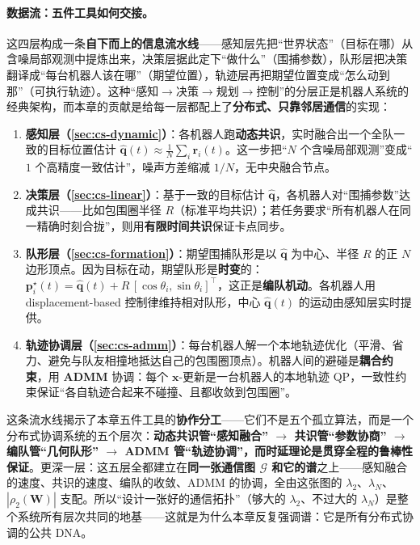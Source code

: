 \paragraph{数据流：五件工具如何交接。}
这四层构成一条\textbf{自下而上的信息流水线}——感知层先把“世界状态”（目标在哪）从含噪局部观测中提炼出来，决策层据此定下“做什么”（围捕参数），队形层把决策翻译成“每台机器人该在哪”（期望位置），轨迹层再把期望位置变成“怎么动到那”（可执行轨迹）。这种“感知$\to$决策$\to$规划$\to$控制”的分层正是机器人系统的经典架构，而本章的贡献是给每一层都配上了\textbf{分布式、只靠邻居通信}的实现：
\begin{enumerate}
  \item \textbf{感知层（\cref{sec:cs-dynamic}）}：各机器人跑\textbf{动态共识}，实时融合出一个全队一致的目标位置估计 $\hat{\mathbf{q}}(t)\approx\tfrac1N\sum_i\mathbf{r}_i(t)$。这一步把“$N$ 个含噪局部观测”变成“$1$ 个高精度一致估计”，噪声方差缩减 $1/N$，无中央融合节点。
  \item \textbf{决策层（\cref{sec:cs-linear}）}：基于一致的目标估计 $\hat{\mathbf{q}}$，各机器人对“围捕参数”达成共识——比如包围圈半径 $R$（标准平均共识）；若任务要求“所有机器人在同一精确时刻合拢”，则用\textbf{有限时间共识}保证卡点同步。
  \item \textbf{队形层（\cref{sec:cs-formation}）}：期望围捕队形是以 $\hat{\mathbf{q}}$ 为中心、半径 $R$ 的正 $N$ 边形顶点。因为目标在动，期望队形是\textbf{时变}的：$\mathbf{p}_i^\star(t)=\hat{\mathbf{q}}(t)+R\,[\cos\theta_i,\sin\theta_i]^\top$，这正是\textbf{编队机动}。各机器人用 displacement-based 控制律维持相对队形，中心 $\hat{\mathbf{q}}(t)$ 的运动由感知层实时提供。
  \item \textbf{轨迹协调层（\cref{sec:cs-admm}）}：每台机器人解一个本地轨迹优化（平滑、省力、避免与队友相撞地抵达自己的包围圈顶点）。机器人间的避碰是\textbf{耦合约束}，用 \textbf{ADMM} 协调：每个 $\mathbf{x}$-更新是一台机器人的本地轨迹 QP，一致性约束保证“各自轨迹合起来不碰撞、且都收敛到包围圈”。
\end{enumerate}

\begin{insight}\label{ins:cs-pipeline}
这条流水线揭示了本章五件工具的\textbf{协作分工}——它们不是五个孤立算法，而是一个分布式协调系统的五个层次：\textbf{动态共识管“感知融合” $\to$ 共识管“参数协商” $\to$ 编队管“几何队形” $\to$ ADMM 管“轨迹协调”，而时延理论是贯穿全程的鲁棒性保证}。更深一层：这五层全都建立在\textbf{同一张通信图 $\mathcal{G}$ 和它的谱}之上——感知融合的速度、共识的速度、编队的收敛、ADMM 的协调，全由这张图的 $\lambda_2$、$\lambda_N$、$|\rho_2(\mathbf{W})|$ 支配。所以“设计一张好的通信拓扑”（够大的 $\lambda_2$、不过大的 $\lambda_N$）是整个系统所有层次共同的地基——这就是为什么本章反复强调谱：它是所有分布式协调的公共 DNA。
\end{insight}

